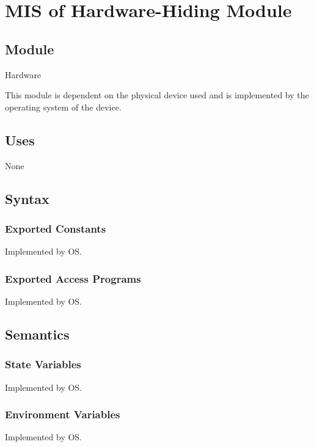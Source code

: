 \documentclass[12pt, titlepage]{article}
\begin{document}
\newpage

\section{MIS of Hardware-Hiding Module} \label{mHH}

\subsection{Module}

Hardware

This module is dependent on the physical device used and is implemented by the operating system of the device.

\subsection{Uses}

None

\subsection{Syntax}

\subsubsection{Exported Constants}

Implemented by OS.

\subsubsection{Exported Access Programs}

Implemented by OS.

\subsection{Semantics}

\subsubsection{State Variables}

Implemented by OS.

\subsubsection{Environment Variables}

Implemented by OS.
\end{document}
